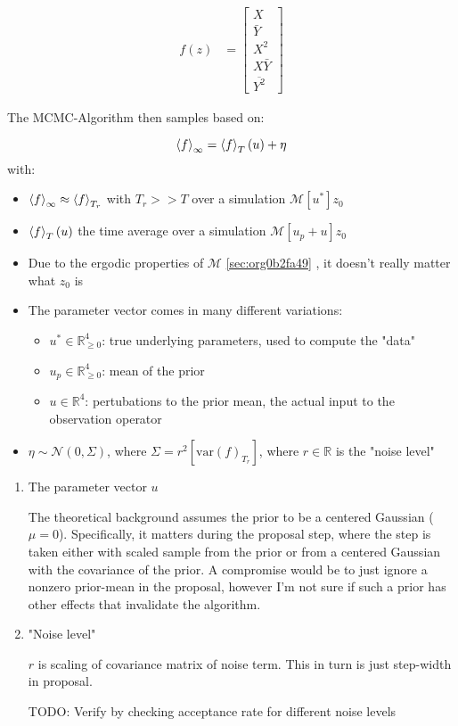 \documentclass[11pt]{article}
\newcommand{\R}{{\mathbb{R}}}
\newcommand{\N}[2]{\mathcal{N}\left(#1,#2\right)}
\begin{document}
\begin{align}
  f(z) &=
  \begin{bmatrix}
    X \\
    \bar{Y} \\
    X^2 \\
    X \bar{Y} \\
    \overline{Y^2}
  \end{bmatrix}
\end{align}

The MCMC-Algorithm then samples based on:

$$\expval{f}_\infty = \expval{f}_T(u) + \eta$$
with:
\begin{itemize}
\item \(\expval{f}_\infty \approx \expval{f}_{T_r}\) with \(T_r >> T\) over a simulation \(\mathcal{M}[u^*] z_0\)
\item \(\expval{f}_T(u)\) the time average over a simulation \(\mathcal{M}[u_p + u] z_0\)
\item Due to the ergodic properties of \(\mathcal{M}\) \ref{sec:org0b2fa49} , it doesn't really matter what \(z_0\) is
\item The parameter vector comes in many different variations:
\begin{itemize}
\item \(u^* \in \R^4_{\geq 0}\): true underlying parameters, used to compute the "data"
\item \(u_p \in \R^4_{\geq 0}\): mean of the prior
\item \(u \in \R^4\): pertubations to the prior mean, the actual input to the observation operator
\end{itemize}
\item \(\eta \sim \N{0}{\Sigma}\), where \(\Sigma = r^2 [\text{var}(f)_{T_r}]\),
where \(r \in \R\) is the "noise level"
\end{itemize}

\begin{enumerate}
\item The parameter vector \(u\)
\label{sec:org27b64d7}

The theoretical background assumes the prior to be a centered Gaussian (\(\mu = 0\)).
Specifically, it matters during the proposal step, where the step is taken either with
scaled sample from the prior or from a centered Gaussian with the covariance of the prior.
A compromise would be to just ignore a nonzero prior-mean in the proposal, however I'm not
sure if such a prior has other effects that invalidate the algorithm.

\item "Noise level"
\label{sec:org2c40a8f}

\(r\) is scaling of covariance matrix of noise term. This in turn is just step-width in proposal.

TODO: Verify by checking acceptance rate for different noise levels
\end{enumerate}
\end{document}
